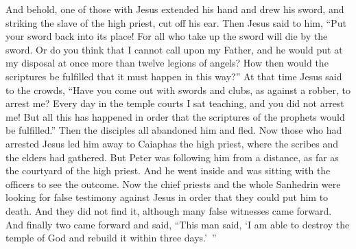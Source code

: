 \begin{biblechapter}
\verse And behold, one of those with Jesus extended his hand and drew his sword, and striking the slave of the high priest, cut off his ear.
\verse Then Jesus said to him, “Put your sword back into its place! For all who take up the sword will die by the sword.
\verse Or do you think that I cannot call upon my Father, and he would put at my disposal at once more than twelve legions of angels?
\verse How then would the scriptures be fulfilled that it must happen in this way?”
\verse At that time Jesus said to the crowds, “Have you come out with swords and clubs, as against a robber, to arrest me? Every day in the temple courts I sat teaching, and you did not arrest me!
\verse But all this has happened in order that the scriptures of the prophets would be fulfilled.” Then the disciples all abandoned him and fled.
 Now those who had arrested Jesus led him away to Caiaphas the high priest, where the scribes and the elders had gathered.
\verse But Peter was following him from a distance, as far as the courtyard of the high priest. And he went inside and was sitting with the officers to see the outcome.
\verse Now the chief priests and the whole Sanhedrin were looking for false testimony against Jesus in order that they could put him to death.
\verse And they did not find it, although many false witnesses came forward. And finally two came forward
\verse and said, “This man said, ‘I am able to destroy the temple of God and rebuild it within three days.’ ”

\end{biblechapter}
